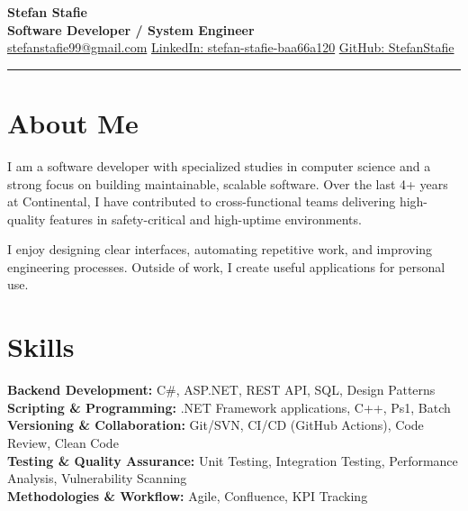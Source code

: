 \documentclass[a4paper,10pt]{article}
\begin{document}
\begin{center}
    \textbf{\Huge Stefan Stafie} \\[0.5em]
    \textbf{Software Developer / System Engineer} \\[0.5em]
    \href{mailto:stefanstafie99@gmail.com}{stefanstafie99@gmail.com} \textbullet{} \href{https://www.linkedin.com/in/stefan-stafie-baa66a120}{LinkedIn: stefan-stafie-baa66a120} \textbullet{} \href{https://github.com/StefanStafie}{GitHub: StefanStafie}
\end{center}

\hrule
\vspace{1em}

\section*{About Me}
I am a software developer with specialized studies in computer science and a strong focus on building maintainable, scalable software. Over the last 4+ years at Continental, I have contributed to cross-functional teams delivering high-quality features in safety-critical and high-uptime environments. 

I enjoy designing clear interfaces, automating repetitive work, and improving engineering processes. Outside of work, I create useful applications for personal use.

\vspace{1em}

\section*{Skills}
\textbf{Backend Development:} C\#, ASP.NET, REST API, SQL, Design Patterns \\
\textbf{Scripting \& Programming:} .NET Framework applications, C++, Ps1, Batch \\
\textbf{Versioning \& Collaboration:} Git/SVN, CI/CD (GitHub Actions), Code Review, Clean Code \\
\textbf{Testing \& Quality Assurance:} Unit Testing, Integration Testing, Performance Analysis, Vulnerability Scanning \\
\textbf{Methodologies \& Workflow:} Agile, Confluence, KPI Tracking

\vspace{1em}

\end{document}
